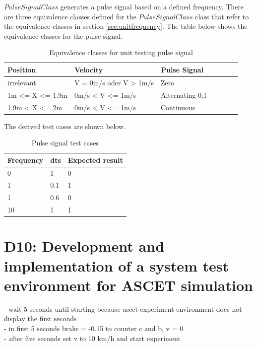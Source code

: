 $PulseSignalClass$ generates a pulse signal based on a defined frequency.
There are three equivalence classes defined for the $PulseSignalClass$ class that refer to the equivalence classes in section \ref{sec:unitfrequency}. 
The table below shows the equivalence classes for the pulse signal.
\begin{table}[H]
\centering
\caption{Equivalence classes for unit testing pulse signal}
\begin{adjustbox}{width=1\textwidth, center=\textwidth}
\renewcommand{\arraystretch}{1}
\begin{tabular}{lllllll}
\textbf{Position} & \textbf{Velocity} & \textbf{Pulse Signal} \\\hline
irrelevant & V = 0m/s oder V > 1m/s & Zero\\
1m <= X <= 1.9m  & 0m/s < V <= 1m/s & Alternating 0,1\\
1.9m < X <= 2m  & 0m/s < V <= 1m/s &Continuous
\end{tabular}
\end{adjustbox}
\end{table}

The derived test cases are shown below.

\begin{table}[H]
\centering
\caption{Pulse signal test cases}
\renewcommand{\arraystretch}{1}
\begin{tabular}{lll}
\textbf{Frequency} & \textbf{dts} & \textbf{Expected result} \\\hline
0         & 1   & 0               \\
1         & 0.1   & 1               \\
1         & 0.6   & 0               \\
10        & 1   & 1              
\end{tabular}
\end{table}

\chapter{D10: Development and implementation of a system test environment for ASCET simulation}\label{cha:D10}

- wait 5 seconds until starting because ascet experiment environment does not display the first seconds \\
- in first 5 seconds brake = -0.15 to counter c and b, v = 0 \\
- after five seconds set v to 10 km/h and start experiment


